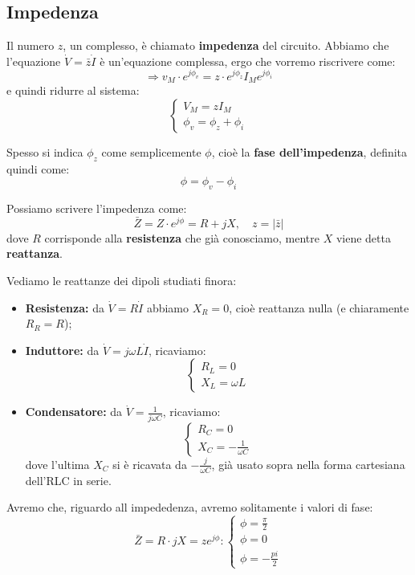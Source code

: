 \documentclass[a4paper,11pt]{article}
\begin{document}
\subsection{Impedenza}
Il numero $z$, un complesso, è chiamato \textbf{impedenza} del circuito.
Abbiamo che l'equazione $\dot{V} = \bar{z} \dot{I}$ è un'equazione complessa, ergo che vorremo riscrivere come:
$$
\Rightarrow v_M \cdot e^{j \phi_v} = z \cdot e^{j \phi_z} I_M e^{j \phi_i}
$$
e quindi ridurre al sistema:
\[
	\begin{cases}
		V_M = z I_M \\ 
		\phi_v = \phi_z + \phi_i
	\end{cases}
\]

Spesso si indica $\phi_z$ come semplicemente $\phi$, cioè la \textbf{fase dell'impedenza}, definita quindi come:
$$
\phi = \phi_v - \phi_i
$$

Possiamo scrivere l'impedenza come:
$$
\bar{Z} = Z \cdot e^{j \phi} = R + j X, \quad z = |\bar{z}|
$$
dove $R$ corrisponde alla \textbf{resistenza} che già conosciamo, mentre $X$ viene detta \textbf{reattanza}.

Vediamo le reattanze dei dipoli studiati finora:
\begin{itemize}
	\item \textbf{Resistenza:} da $\dot{V} = R \dot{I}$ abbiamo $X_R = 0$, cioè reattanza nulla (e chiaramente $R_R = R$);
	\item \textbf{Induttore:} da $\dot{V} = j \omega L \dot{I}$, ricaviamo:
		\[
			\begin{cases}
				R_L = 0	\\ 
				X_L = \omega L
			\end{cases}
		\]
	\item \textbf{Condensatore:} da $\dot{V} = \frac{1}{j \omega C}$, ricaviamo:
		\[
			\begin{cases}
				R_C = 0	\\ 
				X_C = -\frac{1}{\omega C}
			\end{cases}
		\]
		dove l'ultima $X_C$ si è ricavata da $-\frac{j}{\omega C}$, già usato sopra nella forma cartesiana dell'RLC in serie.
\end{itemize}

Avremo che, riguardo all impededenza, avremo solitamente i valori di fase:
$$
\bar{Z} = R \cdot j X = z e^{j \phi}:
	\begin{cases}
		\phi = \frac{\pi}{2} \\ 
		\phi = 0 \\ 
		\phi = -\frac{pi}{2}
	\end{cases}
$$
\end{document}
